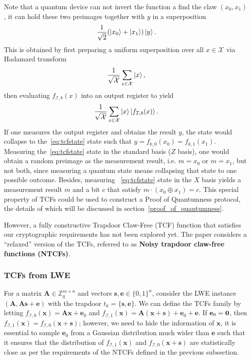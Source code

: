 \documentclass[cryptography,review,submit,pdftex,moreauthors,amsmath,amssymb,aps,strict]{Definitions/mdpi}
\begin{document}
\noindent Note that a quantum device can not invert the function a find the claw $(x_0,x_1)$, it can hold these two preimages together with $y$ in a superposition
\begin{align}
    \frac{1}{\sqrt{2}}(\ket{x_0}+\ket{x_1})\ket{y}.
    \label{eq:tcfstate}
\end{align}
This is obtained by first preparing a uniform superposition over all $x\in\mathcal{X}$ via Hadamard transform
\begin{align}
    \frac{1}{\sqrt{\mathcal{X}}}\sum_{x\in\mathcal{X}}\ket{x},
\end{align}
then evaluating $f_{\mathcal{I},b}(x)$ into an output register to yield 
\begin{align}
    \frac{1}{\sqrt{\mathcal{X}}}\sum_{x\in\mathcal{X}}\ket{x}\ket{f_{\mathcal{I},b}(x)}.
\end{align}
If one measures the output register and obtains the result $y$, the state would collapse to the~\eqref{eq:tcfstate} state such that $y=f_{k,0}(x_0)=f_{k,1}(x_1)$.
Measuring the~\eqref{eq:tcfstate} state in the standard basis ($Z$ basis), one would obtain a random preimage as the measurement result, i.e. $m=x_0$ or $m = x_1$, but not both, since measuring a quantum state means collapsing that state to one possible outcome. Besides, measuring ~\eqref{eq:tcfstate} state in the $X$ basis yields a measurement result $m$ and a bit $c$ that satisfy $m \cdot (x_0\oplus x_1) = c$. This special property of TCFs could be used to construct a Proof of Quantumness protocol, the details of which will be discussed in section~\ref{proof_of_quantumness}.



However, a fully constructive Trapdoor Claw-Free (TCF) function that satisfies our cryptographic requirements has not been explored yet. The paper \cite{Brakerski18_Interactiveproofofquantumness} considers a ``relaxed'' version of the TCFs, referred to as \textbf{Noisy trapdoor claw-free functions (NTCFs)}. 

\subsubsection{TCFs from LWE}
For a matrix $\mathbf{A}\in\mathbb{Z}^{m\times n}_q$ and vectors $\mathbf{s},\mathbf{e}\in\{0,1\}^n$, consider the LWE instance $(\mathbf{A},\mathbf{A}\mathbf{s}+\mathbf{e})$ with the trapdoor $t_k=\{\mathbf{s},\mathbf{e}\}$. We can define the TCFs family by letting $f_{\mathcal{I},0}(\mathbf{x})=\mathbf{A}\mathbf{x}+\mathbf{e}_0$ and $f_{\mathcal{I},1}(\mathbf{x})=\mathbf{A}(\mathbf{x}+\mathbf{s})+\mathbf{e}_0+\mathbf{e}$. If $\mathbf{e}_0 =\bf{0}$, then $f_{\mathcal{I},1}(\mathbf{x})=f_{\mathcal{I},0}(\mathbf{x}+\mathbf{s})$; however, we need to hide the information of $\mathbf{x}$, it is essential to sample $\mathbf{e}_0$ from a Gaussian distribution much wider than $\mathbf{e}$ such that it ensures that the distribution of $f_{\mathcal{I},1}(\mathbf{x})$ and $f_{\mathcal{I},0}(\mathbf{x}+\mathbf{s})$ are statistically close as per the requirements of the NTCFs defined in the previous subsection.
\end{document}

